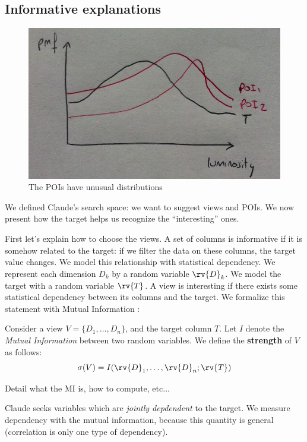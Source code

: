 \subsection{Informative explanations}
\label{sec:infor}
\begin{figure}[t!]
\centering
\includegraphics[width=\columnwidth]{images/poi}
\caption{The POIs have unusual distributions}
\label{poi}
\end{figure}

We defined Claude's search space: we want to suggest views and POIs. We now
present how the target helps us recognize the ``interesting'' ones. 

First let's explain how to choose the views. A set of columns is informative if
it is somehow related to the target: if we filter the data on these columns,
the target value changes.  We model this relationship with statistical
dependency. We represent each  dimension $D_k$ by a random variable $\rv{D}_k$.
We model the target with a random variable $\rv{T}$.  A view is interesting if
there exists some statistical dependency between its columns and the target. We
formalize this statement with Mutual Information \cite{cover2012elements}:

\begin{definition}
Consider a view $V = \{D_1, \ldots, D_n\}$, and the target column $T$.  Let
$I$ denote the \emph{Mutual Information} between two random variables. We
define the \textbf{strength} of $V$ as follows:
\[\sigma(V) = I(\rv{D}_1, \ldots, \rv{D}_n ; \rv{T})\]
\end{definition}

{\color{red}
Detail what the MI is, how to compute, etc...
}

Claude seeks variables which are \emph{jointly depdendent} to the target. We
measure dependency with the mutual information, because this quantity is
general (correlation is only one type of dependency).

